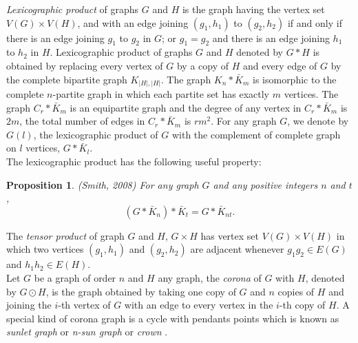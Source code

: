 \documentclass[12pt]{report}
\newtheorem{prop}[thm]{Proposition}
\begin{document}
{\em Lexicographic product} of graphs $G$ and $H$  is the graph
having the vertex set $V(G)\times V(H)$, and with an edge joining
$(g_1,h_1)$ to $(g_2,h_2)$ if and only if there is an edge joining
$g_1$ to $g_2$ in $G$; or $g_1=g_2$ and there is an edge joining
$h_1$ to $h_2$ in $H$. Lexicographic product of graphs $G$ and $H$
denoted by $G*H$ is obtained by replacing every vertex of $G$ by a
copy of $H$ and every edge of $G$ by the complete bipartite graph
$K_{|H|,|H|}$. The graph $K_n *\bar{K}_m$ is isomorphic to the
complete $n$-partite graph in which each partite set has exactly $m$
vertices. The graph $C_r *\bar{K}_m$ is an equipartite graph and the
degree of any vertex in $C_r *\bar{K}_m$ is $2m$, the total number
of edges in $C_r *\bar{K}_m$ is $rm^2$. For any graph $G$, we denote
by $G(l)$, the lexicographic product of $G$ with the
complement of complete graph on $l$ vertices, $G *\bar{K}_l$.\\
The lexicographic product has the following useful property:
\begin{prop}(Smith, 2008)
For any graph $G$ and any positive integers $n$ and $t$,
$$(G*\bar{K}_n)*\bar{K}_t=G*\bar{K}_{nt}.$$
\end{prop}
The {\em tensor product} of graph $G$ and $H$, $G\times H$ has vertex set $V(G)\times V(H)$ in which two vertices $(g_1,h_1)$ and $(g_2,h_2)$ are adjacent whenever $g_1g_2\in E(G)$ and $h_1h_2\in E(H)$.\\
Let $G$ be a graph of order $n$ and $H$ any graph, the {\em corona} of $G$ with $H$, denoted by $G\odot H$, is the graph obtained by taking one copy of $G$ and $n$ copies of $H$ and joining the $i$-th vertex of $G$ with an edge to every vertex in the $i$-th copy of $H$. A special kind of corona graph is a cycle with pendants points which is known as {\em sunlet graph} or {\em n-sun graph} or {\em crown} . \\
\\
\end{document}
